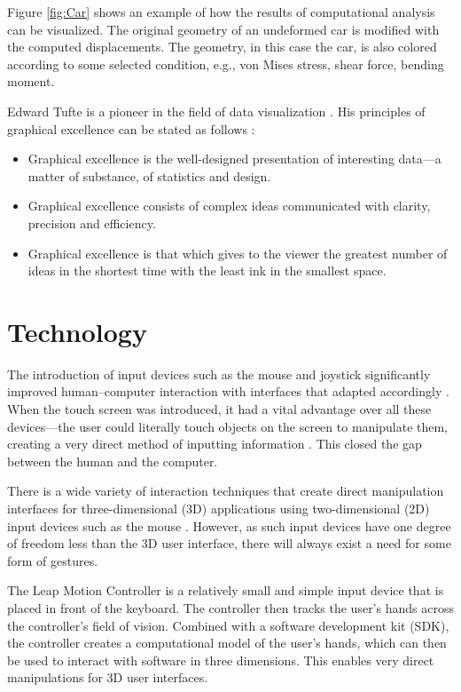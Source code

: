 Figure \ref{fig:Car} shows an example of how the results of computational analysis can be visualized. The original geometry of an undeformed car is modified with the computed displacements. The geometry, in this case the car, is also colored according to some selected condition, e.g., von Mises stress, shear force, bending moment. 

Edward Tufte is a pioneer in the field of data visualization \cite{tufte1997visual, tufte1990envisioning, tufte2001the}. His principles of graphical excellence can be stated as follows \cite{tufte2001the}:

\begin{itemize} 
\item Graphical excellence is the well-designed presentation of interesting data--–a matter of substance, of statistics and design.
\item Graphical excellence consists of complex ideas communicated with clarity, precision and efficiency.
\item Graphical excellence is that which gives to the viewer the greatest number of ideas in the shortest time with the least ink in the smallest space.
\end{itemize} 

\section{Technology}
The introduction of input devices such as the mouse and joystick significantly improved human--computer interaction with interfaces that adapted accordingly \cite{Sears1990}. When the touch screen was introduced, it had a vital advantage over all these devices---the user could literally touch objects on the screen to manipulate them, creating a very direct method of inputting information \cite{Sears1990}. This closed the gap between the human and the computer.

There is a wide variety of interaction techniques that create direct manipulation interfaces for three-dimensional (3D) applications using two-dimensional (2D) input devices such as the mouse \cite{Nielson:1987:DMT:319120.319134}. However, as such input devices have one degree of freedom less than the 3D user interface, there will always exist a need for some form of gestures. 

The Leap Motion Controller \cite{LeapMotion2013} is a relatively small and simple input device that is placed in front of the keyboard. The controller then tracks the user’s hands across the controller’s field of vision. Combined with a software development kit (SDK), the controller creates a computational model of the user’s hands, which can then be used to interact with software in three dimensions. This enables very direct manipulations for 3D user interfaces.

